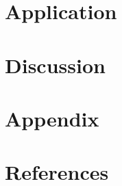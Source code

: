 \documentclass[12pt]{article}
\begin{document}
\section*{Application}
\label{sec:app}

\section*{Discussion}
\label{sec:disc}

\section*{Appendix}
\label{sec:appx}

\section*{References}
\label{sec:refs}
\end{document}
